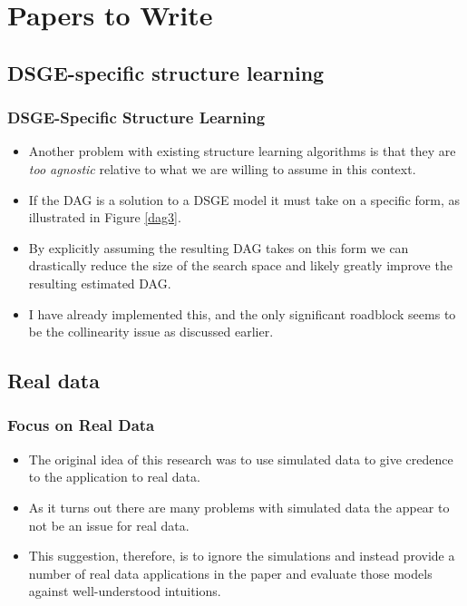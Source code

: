 \documentclass{beamer}
\begin{document}
\section{Papers to Write}

\subsection{DSGE-specific structure learning}
\begin{frame}
    \frametitle{DSGE-Specific Structure Learning}
    \begin{itemize}
        \item Another problem with existing structure learning algorithms is that they are \textit{too agnostic} relative to what we are willing to assume in this context. 
        \item If the DAG is a solution to a DSGE model it must take on a specific form, as illustrated in Figure \ref{dag3}.
        \item By explicitly assuming the resulting DAG takes on this form we can drastically reduce the size of the search space and likely greatly improve the resulting estimated DAG.
        \item I have already implemented this, and the only significant roadblock seems to be the collinearity issue as discussed earlier.
    \end{itemize}
\end{frame}

\subsection{Real data}
\begin{frame}
    \frametitle{Focus on Real Data}
    \begin{itemize}
        \item The original idea of this research was to use simulated data to give credence to the application to real data.
        \item As it turns out there are many problems with simulated data the appear to not be an issue for real data.
        \item This suggestion, therefore, is to ignore the simulations and instead provide a number of real data applications in the paper and evaluate those models against well-understood intuitions.
    \end{itemize}
\end{frame}
\end{document}
